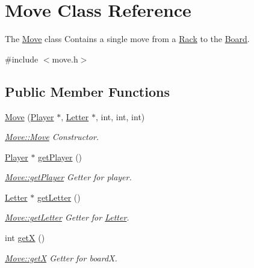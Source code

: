 \hypertarget{class_move}{\section{Move Class Reference}
\label{class_move}
}


The \hyperlink{class_move}{Move} class Contains a single move from a \hyperlink{class_rack}{Rack} to the \hyperlink{class_board}{Board}.  




{\ttfamily \#include $<$move.\-h$>$}

\subsection*{Public Member Functions}
\begin{DoxyCompactItemize}
\item 
\hyperlink{class_move_a6bf1a65d4c0e23849cedfb56ed27046a}{Move} (\hyperlink{class_player}{Player} $\ast$, \hyperlink{class_letter}{Letter} $\ast$, int, int, int)
\begin{DoxyCompactList}\small\item\em \hyperlink{class_move_a6bf1a65d4c0e23849cedfb56ed27046a}{Move\-::\-Move} Constructor. \end{DoxyCompactList}\item 
\hyperlink{class_player}{Player} $\ast$ \hyperlink{class_move_a4b3a579f0516de5a8eda9cc6dfe88eab}{get\-Player} ()
\begin{DoxyCompactList}\small\item\em \hyperlink{class_move_a4b3a579f0516de5a8eda9cc6dfe88eab}{Move\-::get\-Player} Getter for player. \end{DoxyCompactList}\item 
\hyperlink{class_letter}{Letter} $\ast$ \hyperlink{class_move_a0c29654c98269d65c6af694eb441d382}{get\-Letter} ()
\begin{DoxyCompactList}\small\item\em \hyperlink{class_move_a0c29654c98269d65c6af694eb441d382}{Move\-::get\-Letter} Getter for \hyperlink{class_letter}{Letter}. \end{DoxyCompactList}\item 
int \hyperlink{class_move_a7e3169f48fcca1aa1de4a5cbe67a284d}{get\-X} ()
\begin{DoxyCompactList}\small\item\em \hyperlink{class_move_a7e3169f48fcca1aa1de4a5cbe67a284d}{Move\-::get\-X} Getter for board\-X. \end{DoxyCompactList}\item 

\end{DoxyCompactItemize}
